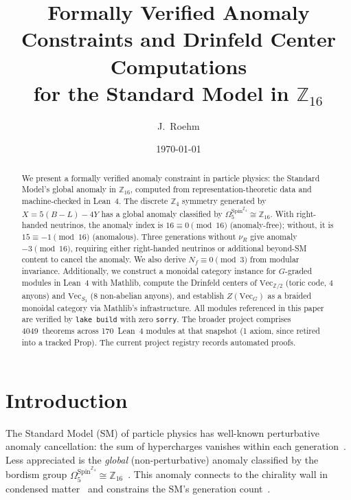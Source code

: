 \documentclass[aps,prl,twocolumn,superscriptaddress]{revtex4-2}
\begin{document}
\title{Formally Verified Anomaly Constraints and Drinfeld Center Computations\\
for the Standard Model in $\mathbb{Z}_{16}$}

\author{J.~Roehm}

\date{\today}

\begin{abstract}
We present a formally verified anomaly constraint in particle physics:
the Standard Model's global anomaly in $\mathbb{Z}_{16}$, computed from
representation-theoretic data and machine-checked in Lean~4. The discrete
$\mathbb{Z}_4$ symmetry generated by $X = 5(B-L) - 4Y$ has a global anomaly
classified by $\Omega_5^{\mathrm{Spin}^{\mathbb{Z}_4}} \cong \mathbb{Z}_{16}$.
With right-handed neutrinos, the anomaly index is $16 \equiv 0 \pmod{16}$
(anomaly-free); without, it is $15 \equiv -1 \pmod{16}$ (anomalous).
Three generations without $\nu_R$ give anomaly $-3 \pmod{16}$, requiring
either right-handed neutrinos or additional beyond-SM content to cancel the anomaly. We also derive $N_f \equiv 0 \pmod{3}$ from modular invariance.
Additionally, we construct a monoidal category instance for $G$-graded
modules in Lean~4 with Mathlib, compute the Drinfeld centers of $\mathrm{Vec}_{\mathbb{Z}/2}$
(toric code, 4 anyons) and $\mathrm{Vec}_{S_3}$ (8 non-abelian anyons), and
establish $Z(\mathrm{Vec}_G)$ as a braided monoidal category via Mathlib's
infrastructure. All modules referenced in this paper are verified by
\texttt{lake build} with zero \texttt{sorry}. The broader project comprises
4049~theorems across 170~Lean~4 modules at that snapshot (1 axiom,
since retired into a tracked Prop). The current project registry records
\aristotleproved{} automated proofs.
\end{abstract}

\maketitle

\section{Introduction}

The Standard Model (SM) of particle physics has well-known perturbative
anomaly cancellation: the sum of hypercharges vanishes within each
generation~\cite{GrossJackiw1972}. Less appreciated is the \emph{global}
(non-perturbative) anomaly classified by the bordism group
$\Omega_5^{\mathrm{Spin}^{\mathbb{Z}_4}} \cong \mathbb{Z}_{16}$~\cite{GarciaEtxebarria2019}.
This anomaly connects to the chirality wall in condensed matter~\cite{GioiaThorngrenPRL2026}
and constrains the SM's generation count~\cite{Wang2024}.
\end{document}
